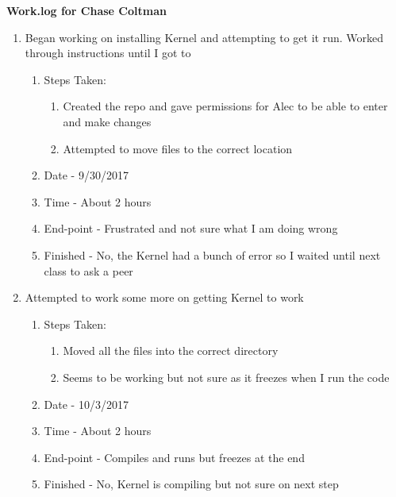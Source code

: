\documentclass[letterpaper,10pt,fleqn]{article}
\begin{document}
\textbf{Work.log for Chase Coltman}
\begin{enumerate}	
	\item Began working on installing Kernel and attempting to get it run. Worked through instructions until I got to
		\begin{enumerate}
			\item Steps Taken:
				\begin{enumerate}
					\item Created the repo and gave permissions for Alec to be able to enter and make changes
					\item Attempted to move files to the correct location
				\end{enumerate}
			\item Date - 9/30/2017
			\item Time - About 2 hours
			\item End-point - Frustrated and not sure what I am doing wrong
			\item Finished - No, the Kernel had a bunch of error so I waited until next class to ask a peer
		\end {enumerate}
		
	\item Attempted to work some more on getting Kernel to work
		\begin{enumerate}
			\item Steps Taken:
				\begin{enumerate}
					\item Moved all the files into the correct directory
					\item Seems to be working but not sure as it freezes when I run the code
				\end{enumerate}
			\item Date - 10/3/2017
			\item Time - About 2 hours
			\item End-point - Compiles and runs but freezes at the end
			\item Finished -  No, Kernel is compiling but not sure on next step
		\end {enumerate}
		

\end{enumerate}
\end{document}

